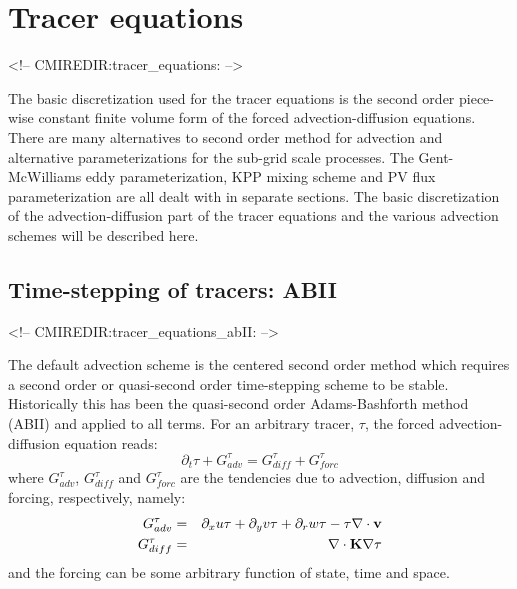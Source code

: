 
\section{Tracer equations}
\label{sec:tracer_equations}
\begin{rawhtml}
<!-- CMIREDIR:tracer_equations: -->
\end{rawhtml}

The basic discretization used for the tracer equations is the second
order piece-wise constant finite volume form of the forced
advection-diffusion equations. There are many alternatives to second
order method for advection and alternative parameterizations for the
sub-grid scale processes. The Gent-McWilliams eddy parameterization,
KPP mixing scheme and PV flux parameterization are all dealt with in
separate sections. The basic discretization of the advection-diffusion
part of the tracer equations and the various advection schemes will be
described here.

\subsection{Time-stepping of tracers: ABII}
\label{sec:tracer_equations_abII}
\begin{rawhtml}
<!-- CMIREDIR:tracer_equations_abII: -->
\end{rawhtml}

The default advection scheme is the centered second order method which
requires a second order or quasi-second order time-stepping scheme to
be stable. Historically this has been the quasi-second order
Adams-Bashforth method (ABII) and applied to all terms. For an
arbitrary tracer, $\tau$, the forced advection-diffusion equation
reads:
\begin{equation}
\partial_t \tau + G_{adv}^\tau = G_{diff}^\tau + G_{forc}^\tau
\end{equation}
where $G_{adv}^\tau$, $G_{diff}^\tau$ and $G_{forc}^\tau$ are the
tendencies due to advection, diffusion and forcing, respectively,
namely:
\begin{eqnarray}
G_{adv}^\tau & = & \partial_x u \tau + \partial_y v \tau + \partial_r w \tau
- \tau \nabla \cdot {\bf v} \\
G_{diff}^\tau & = & \nabla \cdot {\bf K} \nabla \tau
\end{eqnarray}
and the forcing can be some arbitrary function of state, time and
space.

